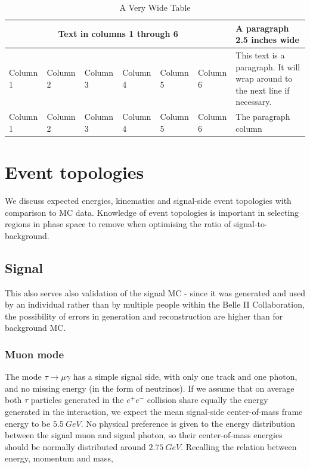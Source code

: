 \documentclass[12pt]{thesis}  %
\begin{document}
\begin{table}
\bigskip
\centering  
  \begin{tabular}{|l|l|l|l|l|l|p{2.5in}|}  
  \hline  
  \multicolumn{6}{|c|}{Text in columns 1 through 6}   
        & A paragraph 2.5 inches wide \\  
  \hline  
  Column 1 & Column 2 & Column 3 & Column 4 & Column 5 & Column 6
                      & This text is a paragraph.  It will wrap  
                      around to the next line if necessary. \\  
  Column 1 & Column 2 & Column 3 & Column 4 & Column 5 & Column 6
                      & The paragraph column \\  
  \hline  
  \end{tabular}  
  \caption{A Very Wide Table}  	
\end{table}


\pagebreak


\chapter{Event topologies}

We discuss expected energies, kinematics and signal-side event topologies with comparison to MC data. Knowledge of event topologies is important in selecting regions in phase space to remove when optimising the ratio of signal-to-background. 

\section{Signal}

This also serves also validation of the signal MC - since it was generated and used by an individual rather than by multiple people within the Belle II Collaboration, the possibility of errors in generation and reconstruction are higher than for background MC. 


\subsection{Muon mode}

The mode $\tau\to\mu\gamma$ has a simple signal side, with only one track and one photon, and no missing energy (in the form of neutrinos). If we assume that on average both $\tau$ particles generated in the $e^+ e^-$ collision share equally the energy generated in the interaction, we expect the mean signal-side center-of-mass frame energy to be $\SI{5.5}{GeV}$. No physical preference is given to the energy distribution between the signal muon and signal photon, so their center-of-mass energies should be normally distributed around $\SI{2.75}{GeV}$. Recalling the relation between energy, momentum and mass,
\end{document}
